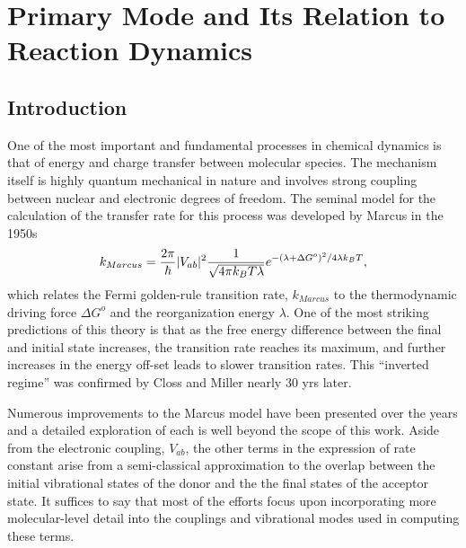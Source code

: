 \chapter{Primary Mode and Its Relation to Reaction Dynamics}\label{chap:chapt3}

\section{Introduction}

One of the most important and fundamental processes in chemical  dynamics is
that of energy and charge transfer between molecular species.  The mechanism
itself is highly quantum mechanical in nature and involves strong coupling between nuclear and
electronic degrees of freedom.  The seminal model for the calculation of the transfer rate for this process
was developed by Marcus in the 1950s \cite{marcus1956theory,marcus1965theory,marcus1993electron}
\begin{equation}
k_{Marcus}=\frac{2\pi}{\hbar}|V_{ab}|^{2}\frac{1}{\sqrt{4\text{\ensuremath{\pi}}k_{B}T\lambda}}e^{-(\lambda+ \Delta G^{o})^{2}/4\text{\ensuremath{\lambda}}k_{B}T},
\end{equation}
which relates the Fermi golden-rule transition rate, $k_{Marcus}$
to the thermodynamic driving force $\Delta G^{o}$ and the reorganization energy $\lambda$.
One of the most striking predictions of this theory is that as the free energy difference between the final and initial state increases, the transition rate reaches its maximum,
and further increases in the energy off-set leads to slower transition rates.
This ``inverted regime''  was confirmed by Closs and Miller \cite{miller1984intramolecular,closs1988determination,closs1989connection}
nearly 30 yrs later.

Numerous improvements to the Marcus model have been presented over the years and
a detailed exploration of each is well beyond the scope of this work.
Aside from the electronic coupling, $V_{ab}$,  the other terms in the expression of rate constant arise from
a semi-classical approximation to the overlap between the initial vibrational states of the donor and the
the final  states of the acceptor state. It suffices to say that most of the
efforts focus upon incorporating more molecular-level detail into the couplings and vibrational modes
used in computing these terms.

